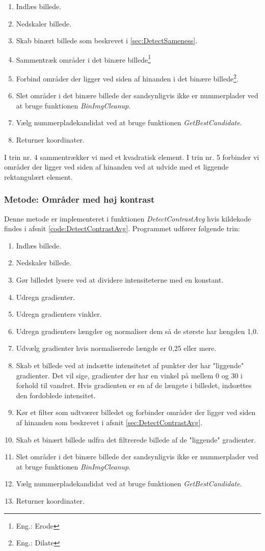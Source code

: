 \begin{enumerate}
\item Indlæs billede.
\item Nedskaler billede.
\item Skab binært billede som beskrevet i \ref{sec:DetectSameness}.
\item Sammentræk områder i det binære billede\footnote{Eng.: Erode}
\item Forbind områder der ligger ved siden af hinanden i det binære billede\footnote{Eng.: Dilate}.
\item Slet områder i det binære billede der sandsynligvis ikke er nummerplader ved at bruge funktionen \textit{BinImgCleanup}.
\item Vælg nummerpladekandidat ved at bruge funktionen \textit{GetBestCandidate}.
\item Returner koordinater.
\end{enumerate}

I trin nr. 4 sammentrækker vi med et kvadratisk element. I trin nr. 5 forbinder vi områder der ligger ved siden af hinanden ved at udvide med et liggende rektangulært element. 


\subsubsection{Metode: Områder med høj kontrast}
Denne metode er implementeret i funktionen \textit{DetectContrastAvg} hvis kildekode findes i afsnit \vref{code:DetectContrastAvg}. Programmet udfører følgende trin:

\begin{enumerate}
\item Indlæs billede.
\item Nedskaler billede.
\item Gør billedet lysere ved at dividere intensiteterne med en konstant.
\item Udregn gradienter.
\item Udregn gradienters vinkler.
\item Udregn gradienters længder og normaliser dem så de største har længden 1,0.
\item Udvælg gradienter hvis normaliserede længde er 0,25 eller mere.
\item Skab et billede ved at indsætte intensitetet af punkter der har "liggende" gradienter. Det vil sige, gradienter der har en vinkel på mellem 0 og 30 i forhold til vandret. Hvis gradienten er en af de længste i billedet, indsættes den fordoblede intensitet.
\item Kør et filter som udtværer billedet og forbinder områder der ligger ved siden af hinanden som beskrevet i afsnit \ref{sec:DetectContrastAvg}.
\item Skab et binært billede udfra det filtrerede billede af de "liggende" gradienter. 
\item Slet områder i det binære billede der sandsynligvis ikke er nummerplader ved at bruge funktionen \textit{BinImgCleanup}.
\item Vælg nummerpladekandidat ved at bruge funktionen \textit{GetBestCandidate}.
\item Returner koordinater.
\end{enumerate}

